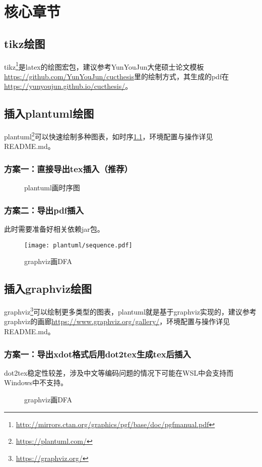 
\chapter{核心章节}
\label{cha:3}
\section{tikz绘图}
\par tikz\footnote{\url{http://mirrors.ctan.org/graphics/pgf/base/doc/pgfmanual.pdf}}是latex的绘图宏包，建议参考YunYouJun大佬硕士论文模板\url{https://github.com/YunYouJun/cucthesis}里的绘制方式，其生成的pdf在\url{https://yunyoujun.github.io/cucthesis/}。
\section{插入plantuml绘图}
\par plantuml\footnote{\url{https://plantuml.com/}}可以快速绘制多种图表，如时序\cref{fig:plantuml_tex}，环境配置与操作详见README.md。
\subsection{方案一：直接导出tex插入（推荐）}
\begin{figure}[htbp]
    \centering
    \resizebox{0.8\textwidth}{!}{}
    \caption{plantuml画时序图}
    \label{fig:plantuml_tex}
\end{figure}
\subsection{方案二：导出pdf插入}
\par 此时需要准备好相关依赖jar包。
\begin{figure}[htbp]
    \centering
    \texttt{[image: plantuml/sequence.pdf]}
    \caption{graphviz画DFA}
    \label{fig:plantuml_pdf}
\end{figure}
\section{插入graphviz绘图}
\par graphviz\footnote{\url{https://graphviz.org/}}可以绘制更多类型的图表，plantuml就是基于graphviz实现的，建议参考graphviz的画廊\url{https://www.graphviz.org/gallery/}，环境配置与操作详见README.md。
\subsection{方案一：导出xdot格式后用dot2tex生成tex后插入}
\par dot2tex稳定性较差，涉及中文等编码问题的情况下可能在WSL中会支持而Windows中不支持。
\begin{figure}[htbp]
    \centering
    \resizebox{0.8\textwidth}{!}{}
    \caption{graphviz画DFA}
    \label{fig:graphviz_tex}
\end{figure}

